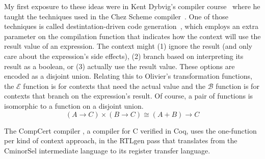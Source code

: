 \documentclass[sigplan,review,dvipsnames,screen,10pt]{acmart}
\begin{document}
My first exposure to these ideas were in Kent Dybvig's compiler
course~\citep{Dybvig:2010aa} where he taught the techniques used in
the Chez Scheme compiler~\citep{Dybvig:2006aa}.  One of those
techniques is called destintation-driven code
generation~\cite{Dybvig:1990aa}, which employs an extra parameter on
the compilation function that indicates how the context will use the
result value of an expression. The context might (1) ignore the result
(and only care about the expression's side effects), (2) branch based
on interpreting its result as a boolean, or (3) actually use the
result value. These options are encoded as a disjoint union.  Relating
this to Olivier's transformation functions, the $\mathcal{E}$ function
is for contexts that need the actual value and the $\mathcal{B}$
function is for contexts that branch on the expression's result. Of
course, a pair of functions is isomorphic to a function on a disjoint
union.
\[
(A \to C) \times (B \to C) \cong (A + B) \to C
\]

The CompCert compiler \citep{Leroy:2006fe}, a compiler for C verified
in Coq, uses the one-function per kind of context approach, in the
RTLgen pass that translates from the CminorSel intermediate language
to its register transfer language.











\end{document}
